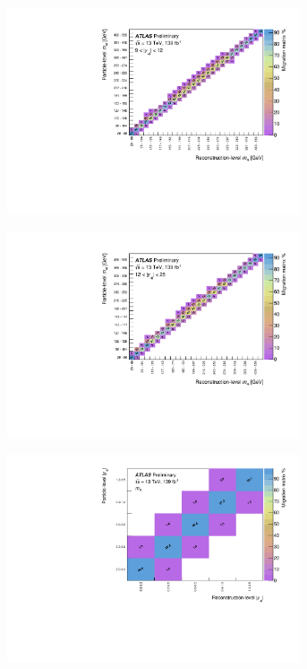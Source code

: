 \begin{figure}[htb]
  \begin{subfigure}{.49\textwidth}\centering\includegraphics[width = 0.95\textwidth]{Figures/m4l/UnfoldingStudies/v014_matrices/m4l_y4l9-12Matrix.pdf}\end{subfigure}
  \begin{subfigure}{.49\textwidth}\centering\includegraphics[width = 0.95\textwidth]{Figures/m4l/UnfoldingStudies/v014_matrices/m4l_y4l12-25Matrix.pdf}\end{subfigure}
 \begin{subfigure}{.49\textwidth}\centering\includegraphics[width = 0.95\textwidth]{Figures/m4l/UnfoldingStudies/v014_matrices/m4l_y4lMatrix.pdf}\end{subfigure}

\end{figure}
